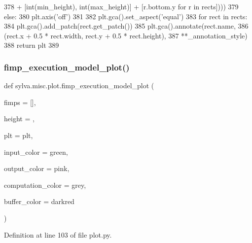 \begin{DoxyCode}
378                                     + [int(min\_height), int(max\_height)] + [r.bottom.y \textcolor{keywordflow}{for} r \textcolor{keywordflow}{in} rects])))
379         \textcolor{keywordflow}{else}:
380             plt.axis(\textcolor{stringliteral}{'off'})
381 
382         plt.gca().set\_aspect(\textcolor{stringliteral}{'equal'})
383         \textcolor{keywordflow}{for} rect \textcolor{keywordflow}{in} rects:
384             plt.gca().add\_patch(rect.get\_patch())
385             plt.gca().annotate(rect.name,
386                                (rect.x + 0.5 * rect.width, rect.y + 0.5 * rect.height),
387                                **\_annotation\_style)
388         \textcolor{keywordflow}{return} plt
389 
\end{DoxyCode}
\mbox{\label{namespacesylva_1_1misc_1_1plot_a2e27375ca68228e819017903e39e39d9}} 
\subsubsection{\texorpdfstring{fimp\+\_\+execution\+\_\+model\+\_\+plot()}{fimp\_execution\_model\_plot()}}
{\footnotesize\ttfamily def sylva.\+misc.\+plot.\+fimp\+\_\+execution\+\_\+model\+\_\+plot (\begin{DoxyParamCaption}\item[{}]{fimps = {\ttfamily \mbox{[}\mbox{]}},  }\item[{}]{height = {},  }\item[{}]{plt = {\ttfamily plt},  }\item[{}]{input\+\_\+color = {\ttfamily \textquotesingle{}green\textquotesingle{}},  }\item[{}]{output\+\_\+color = {\ttfamily \textquotesingle{}pink\textquotesingle{}},  }\item[{}]{computation\+\_\+color = {\ttfamily \textquotesingle{}grey\textquotesingle{}},  }\item[{}]{buffer\+\_\+color = {\ttfamily \textquotesingle{}darkred\textquotesingle{}} }\end{DoxyParamCaption})}



Definition at line 103 of file plot.\+py.




